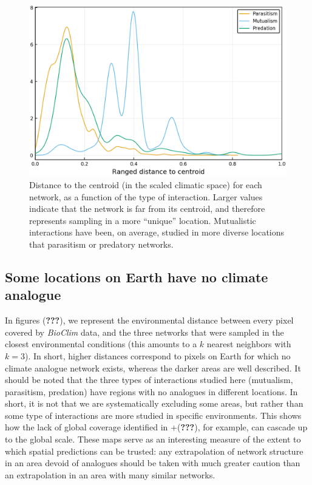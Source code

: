 \documentclass[11pt]{article}
\begin{document}
\begin{figure}
\hypertarget{fig:ecc}{%
\centering
\includegraphics{figures/distance_to_centroid.png}
\caption{Distance to the centroid (in the scaled climatic space) for
each network, as a function of the type of interaction. Larger values
indicate that the network is far from its centroid, and therefore
represents sampling in a more ``unique'' location. Mutualistic
interactions have been, on average, studied in more diverse locations
that parasitism or predatory networks.}\label{fig:ecc}
}
\end{figure}

\hypertarget{some-locations-on-earth-have-no-climate-analogue}{%
\subsection{Some locations on Earth have no climate
analogue}\label{some-locations-on-earth-have-no-climate-analogue}}

In figures ({\textbf{???}}), we represent the environmental distance
between every pixel covered by \emph{BioClim} data, and the three
networks that were sampled in the closest environmental conditions (this
amounts to a \(k\) nearest neighbors with \(k = 3\)). In short, higher
distances correspond to pixels on Earth for which no climate analogue
network exists, whereas the darker areas are well described. It should
be noted that the three types of interactions studied here (mutualism,
parasitism, predation) have regions with no analogues in different
locations. In short, it is not that we are systematically excluding some
areas, but rather than some type of interactions are more studied in
specific environments. This shows how the lack of global coverage
identified in +({\textbf{???}}), for example, can cascade up to the
global scale. These maps serve as an interesting measure of the extent
to which spatial predictions can be trusted: any extrapolation of
network structure in an area devoid of analogues should be taken with
much greater caution than an extrapolation in an area with many similar
networks.
\end{document}
